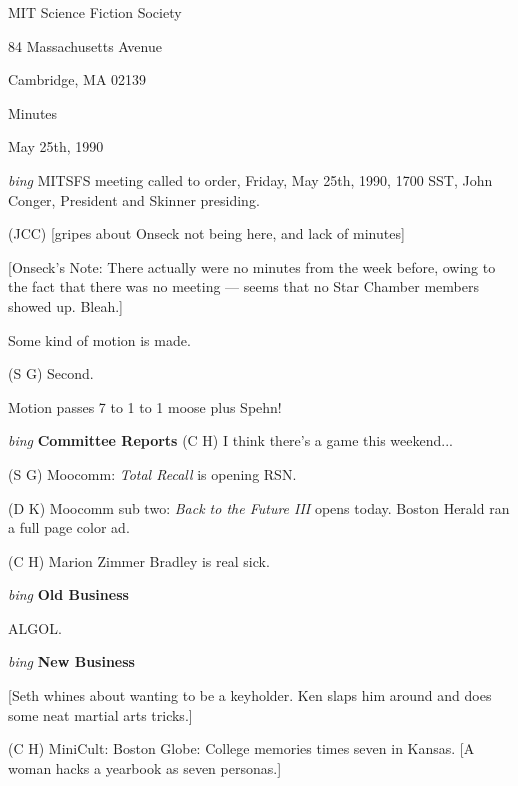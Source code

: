 \setlength{\topmargin}{-0.5in}
\setlength{\oddsidemargin}{0.0in}
\setlength{\evensidemargin}{0.0in}
\setlength{\textheight}{9in}
\setlength{\textwidth}{6.5in}



\begin{center}
MIT Science Fiction Society

84 Massachusetts Avenue

Cambridge, MA 02139

\vspace{0.2in}
Minutes

May 25th, 1990

\end{center}
 
\vspace{0.15in}
{\em bing\/}  MITSFS meeting called to order, Friday, May 25th, 1990,
1700 SST, John Conger, President and Skinner presiding.

(JCC)  [gripes about Onseck not being here, and lack of minutes]

[Onseck's Note: There actually were no minutes from the week before, owing to
the fact that there was no meeting --- seems that no Star Chamber members
showed up.  Bleah.]

Some kind of motion is made.

(S G)  Second.

Motion passes 7 to 1 to 1 moose plus Spehn!

\vspace{0.15in}
{\em bing\/}  {\bf Committee Reports}
(C H)  I think there's a game this weekend...

(S G)  Moocomm:  {\em Total Recall\/} is opening RSN.

(D K)  Moocomm sub two:  {\em Back to the Future III\/} opens today.
Boston Herald ran a full page color ad.

(C H)  Marion Zimmer Bradley is real sick.

\vspace{0.15in}
{\em bing\/}  {\bf Old Business}

ALGOL.

\vspace{0.15in}
{\em bing\/}  {\bf New Business}

[Seth whines about wanting to be a keyholder.  Ken slaps him around and
does some neat martial arts tricks.]

(C H)  MiniCult: Boston Globe: College memories times seven in Kansas.
[A woman hacks a yearbook as seven personas.]

